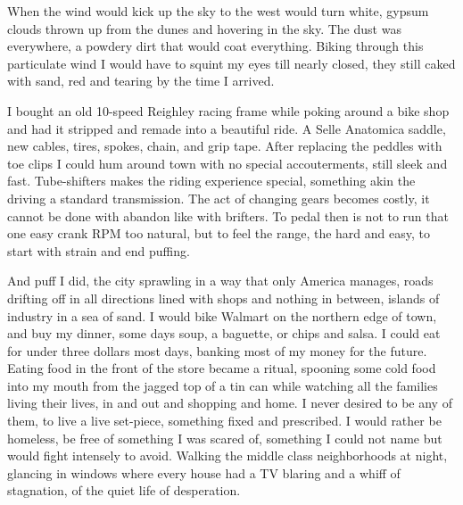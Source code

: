 \documentclass[ebook, 10pt, openright, onecolumn]{memoir}
\begin{document}
When the wind would kick up the sky to the west would turn white, gypsum clouds
thrown up from the dunes and hovering in the sky.  The dust was everywhere, a
powdery dirt that would coat everything.  Biking through this particulate wind I
would have to squint my eyes till nearly closed, they still caked with sand, red
and tearing by the time I arrived.  

I bought an old 10-speed Reighley racing frame while poking around a bike shop
and had it stripped and remade into a beautiful ride.  A Selle Anatomica saddle,
new cables, tires, spokes, chain, and grip tape.  After replacing the peddles
with toe clips I could hum around town with no special accouterments, still
sleek and fast. Tube-shifters makes the riding experience special, something
akin the driving a standard transmission.  The act of changing gears becomes
costly, it cannot be done with abandon like with brifters.  To pedal then is not
to run that one easy crank RPM too natural, but to feel the range, the hard and
easy, to start with strain and end puffing.

And puff I did, the city sprawling in a way that only America manages, roads
drifting off in all directions lined with shops and nothing in between, islands
of industry in a sea of sand.  I would bike Walmart on the northern edge of
town, and buy my dinner, some days soup, a baguette, or chips and salsa.  I
could eat for under three dollars most days, banking most of my money for the
future.  Eating food in the front of the store became a ritual, spooning some
cold food into my mouth from the jagged top of a tin can while watching all the
families living their lives, in and out and shopping and home.  I never desired
to be any of them, to live a live set-piece, something fixed and prescribed.  I
would rather be homeless, be free of something I was scared of, something I
could not name but would fight intensely to avoid.  Walking the middle class
neighborhoods at night, glancing in windows where every house had a TV blaring
and a whiff of stagnation, of the quiet life of desperation.  
\end{document}
